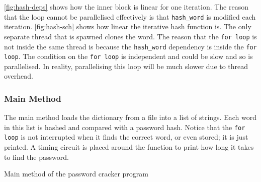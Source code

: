 \autoref{fig:hash-deps} shows how the inner block is linear for one iteration. The reason that the loop cannot be parallelised effectively is that \texttt{hash\_word} is modified each iteration.
\autoref{fig:hash-sch} shows how linear the iterative hash function is. The only separate thread that is spawned clones the word. The reason that the \texttt{for loop} is not inside the same thread is because the \texttt{hash\_word} dependency is inside the \texttt{for loop}. The condition on the \texttt{for loop} is independent and could be slow and so is parallelised. In reality, parallelising this loop will be much slower due to thread overhead.

\subsubsection{Main Method}
The main method loads the dictionary from a file into a list of strings. Each word in this list is hashed and compared with a password hash. Notice that the \texttt{for loop} is not interrupted when it finds the correct word, or even stored; it is just printed. A timing circuit is placed around the function to print how long it takes to find the password.

\begin{code}
    \caption{Main method of the password cracker program}
\end{code}

